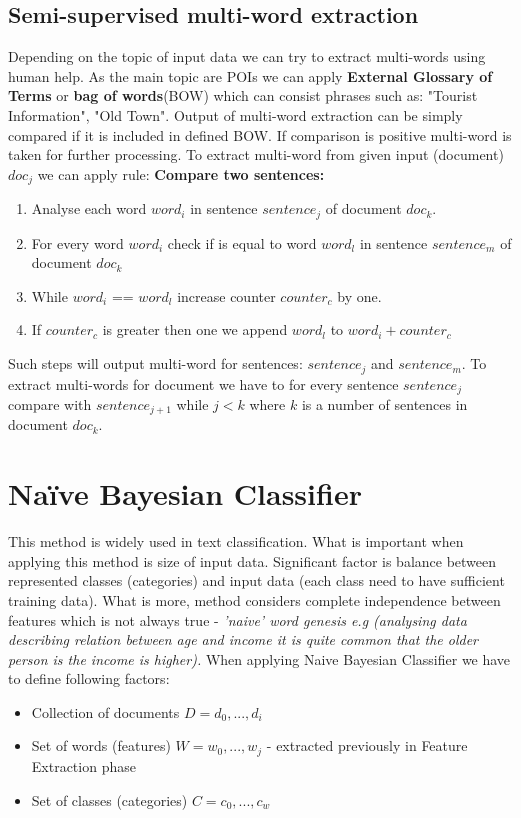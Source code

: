 \subsection{Semi-supervised multi-word extraction}
Depending on the topic of input data we can try to extract multi-words using human help. As the main topic are POIs we can apply \textbf{External Glossary of Terms} or \textbf{bag of words}(BOW)\cite{1} which can consist phrases such as: "Tourist Information", "Old Town". Output of multi-word extraction can be simply compared if it is included in defined BOW. If comparison is positive multi-word is taken for further processing. To extract multi-word from given input (document) $doc_j$ we can apply rule:
\newline\textbf{Compare two sentences:}
\begin{enumerate}	
	\item Analyse each word $word_i$ in sentence $sentence_j$ of document $doc_k$.
	\item For every word $word_i$ check if is equal to word $word_l$ in sentence $sentence_m$ of document $doc_k$
	\item While $word_i$ == $word_l$ increase counter $counter_c$ by one. 
	\item If $counter_c$ is greater then one we append $word_l$ to $word_i + counter_c$ 
\end{enumerate}
Such steps will output multi-word for sentences: $sentence_j$ and $sentence_m$. To extract multi-words for document we have to for every sentence $sentence_j$ compare with $sentence_{j+1}$ while $j<k$ where $k$ is a number of sentences in document $doc_k$.

\section{Naïve Bayesian Classifier}
This method is widely used in text classification. What is important when applying this method is size of input data. Significant factor is balance between represented classes (categories) and input data (each class need to have sufficient training data). What is more, method considers complete independence between features which is not always true - \textit{'naive' word genesis e.g (analysing data describing relation between age and income it is quite common that the older person is the income is higher).} \cite{4}
\newline When applying Naive Bayesian Classifier we have to define following factors:
\begin{itemize}
	\item Collection of documents $D = {d_0,...,d_i}$
	\item Set of words (features) $W = {w_0,...,w_j}$ - extracted previously in Feature Extraction phase
	\item Set of classes (categories) $C = {c_0,...,c_w}$
\end{itemize}  
 
